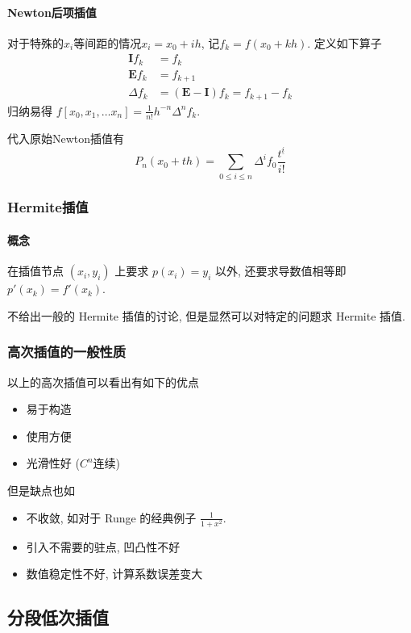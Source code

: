 \documentclass{ctexart}
\begin{document}
\paragraph{Newton后项插值}
    对于特殊的$x_i$等间距的情况$x_i = x_0 + ih$, 记$f_k = f(x_0+kh)$. 定义如下算子\begin{align*}
        \mathbf{I} f_k &= f_k\\
        \mathbf{E} f_k &= f_{k+1}\\
        \Delta f_k & = (\mathbf{E} - \mathbf{I}) f_k = f_{k+1}-f_k
    \end{align*}
    归纳易得 $f[x_0,x_1,\ldots x_n] = \frac{1}{n!} h^{-n} \Delta^n f_k$.\par
    代入原始Newton插值有 \[
        P_n(x_0 + th) = \sum_{0\le i\le n} \Delta^i f_0 \frac{t^{\underline{i}}}{i!}\]
\subsubsection{Hermite插值}
\paragraph{概念}
    在插值节点 $(x_i, y_i)$ 上要求 $p(x_i) = y_i$ 以外,
    还要求导数值相等即 $p'(x_k) = f'(x_k)$.\par
    不给出一般的 Hermite 插值的讨论,
    但是显然可以对特定的问题求 Hermite 插值.
\subsubsection{高次插值的一般性质}
    以上的高次插值可以看出有如下的优点 \begin{itemize}
        \item 易于构造
        \item 使用方便
        \item 光滑性好 ($C^n$连续)
    \end{itemize}
    但是缺点也如 \begin{itemize}
        \item 不收敛, 如对于 Runge 的经典例子 $\frac{1}{1+x^2}$.
        \item 引入不需要的驻点, 凹凸性不好
        \item 数值稳定性不好, 计算系数误差变大
    \end{itemize}

\subsection{分段低次插值}
\end{document}
